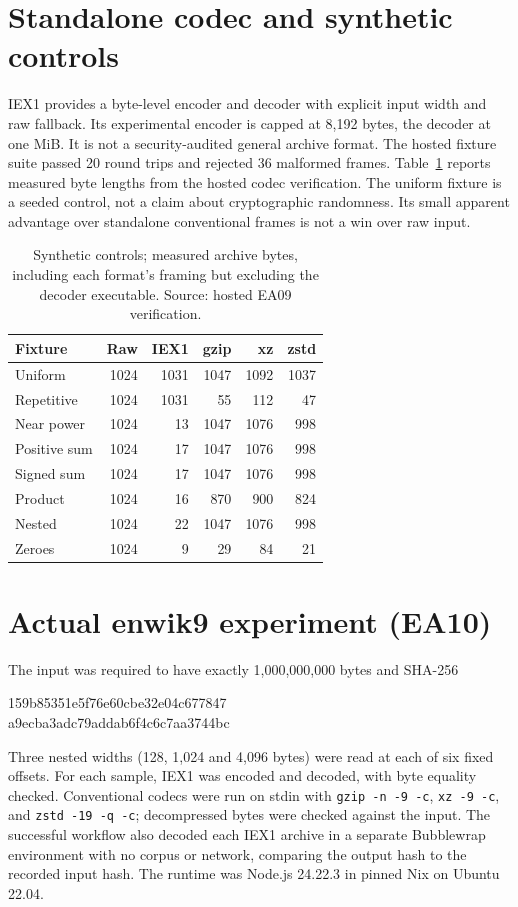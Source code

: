 \documentclass[11pt,a4paper]{article}
\begin{document}
\section{Standalone codec and synthetic controls}
IEX1 provides a byte-level encoder and decoder with explicit input width and raw fallback. Its experimental encoder is capped at 8,192 bytes, the decoder at one MiB. It is not a security-audited general archive format. The hosted fixture suite passed 20 round trips and rejected 36 malformed frames. Table~\ref{tab:controls} reports measured byte lengths from the hosted codec verification. The uniform fixture is a seeded control, not a claim about cryptographic randomness. Its small apparent advantage over standalone conventional frames is not a win over raw input.
\begin{table}[htbp]
\centering\small
\begin{tabular}{@{}lrrrrr@{}}\toprule
Fixture & Raw & IEX1 & gzip & xz & zstd\\\midrule
Uniform & 1024 & 1031 & 1047 & 1092 & 1037\\
Repetitive & 1024 & 1031 & 55 & 112 & 47\\
Near power & 1024 & 13 & 1047 & 1076 & 998\\
Positive sum & 1024 & 17 & 1047 & 1076 & 998\\
Signed sum & 1024 & 17 & 1047 & 1076 & 998\\
Product & 1024 & 16 & 870 & 900 & 824\\
Nested & 1024 & 22 & 1047 & 1076 & 998\\
Zeroes & 1024 & 9 & 29 & 84 & 21\\\bottomrule
\end{tabular}
\caption{Synthetic controls; measured archive bytes, including each format's framing but excluding the decoder executable. Source: hosted EA09 verification.}
\label{tab:controls}
\end{table}

\section{Actual enwik9 experiment (EA10)}
The input was required to have exactly 1,000,000,000 bytes and SHA-256
\begin{center}\small\ttfamily
159b85351e5f76e60cbe32e04c677847\\a9ecba3adc79addab6f4c6c7aa3744bc
\end{center}
Three nested widths (128, 1,024 and 4,096 bytes) were read at each of six fixed offsets. For each sample, IEX1 was encoded and decoded, with byte equality checked. Conventional codecs were run on stdin with \texttt{gzip -n -9 -c}, \texttt{xz -9 -c}, and \texttt{zstd -19 -q -c}; decompressed bytes were checked against the input. The successful workflow also decoded each IEX1 archive in a separate Bubblewrap environment with no corpus or network, comparing the output hash to the recorded input hash. The runtime was Node.js 24.22.3 in pinned Nix on Ubuntu 22.04.
\end{document}
